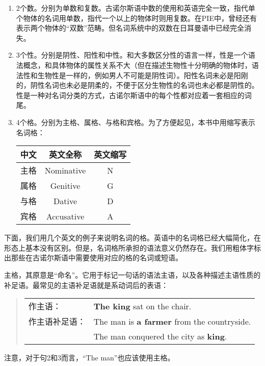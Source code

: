 \begin{enumerate}

  \item
        2个数。分别为单数和复数。古诺尔斯语中数的使用和英语完全一致，指代单个物体的名词用单数，指代一个以上的物体时则用复数。在PIE中，曾经还有表示两个物体的“双数”范畴。但名词系统中的双数在日耳曼语中已经完全消失。
  \item
        3个性。分别是阴性、阳性和中性。和大多数区分性的语言一样，性是一个语法概念，和具体物体的属性关系不大（但在描述生物性十分明确的物体时，语法性和生物性是一样的，例如男人不可能是阴性词）。阳性名词未必是阳刚的，阴性名词也未必是阴柔的，不便于区分生物性的名词也未必都是阴性的。性是一种对名词分类的方式，古诺尔斯语中的每个性都对应着一套相应的词尾。
  \item
        4个格。分别为主格、属格、与格和宾格。为了方便起见，本书中用缩写表示名词格：
        \begin{longtable}{ccc}
          \toprule
          \textbf{中文} & \textbf{英文全称} & \textbf{英文缩写} \\
          \midrule
          \endhead
          \bottomrule
          \endfoot
          主格          & Nominative    & N             \\
          属格          & Genitive      & G             \\
          与格          & Dative        & D             \\
          宾格          & Accusative    & A             \\
        \end{longtable}
\end{enumerate}

下面，我们用几个英文的例子来说明名词的格。英语中的名词格已经大幅简化，在形态上基本没有区别。但是，名词格所承担的语法意义仍然存在。我们用粗体字标出那些在古诺尔斯语中需要使用对应的格的名词或短语。

主格，其原意是“命名”。它用于标记一句话的语法主语，以及各种描述主语性质的补足语。最常见的主语补足语就是系动词后的表语：
\begin{quote}
  \begin{tabular}{ll}
    作主语：    & \textbf{The king} sat on the chair.                \\
    作主语补足语： & The man is \textbf{a farmer} from the countryside. \\
            & The man conquered the city as \textbf{king}.       \\
  \end{tabular}
\end{quote}
注意，对于句2和3而言，``The man''也应该使用主格。

